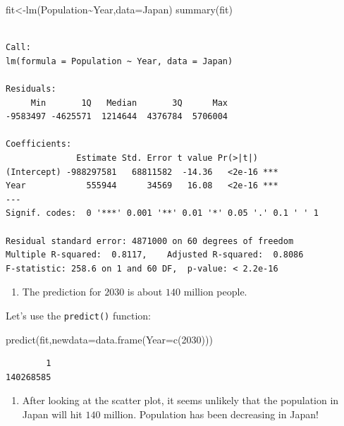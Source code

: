 \documentclass[
  letterpaper,
  DIV=11,
  numbers=noendperiod]{scrreprt}
\newenvironment{Shaded}{\begin{snugshade}}{\end{snugshade}}
\newcommand{\AttributeTok}[1]{\textcolor[rgb]{0.40,0.45,0.13}{#1}}
\newcommand{\DecValTok}[1]{\textcolor[rgb]{0.68,0.00,0.00}{#1}}
\newcommand{\FunctionTok}[1]{\textcolor[rgb]{0.28,0.35,0.67}{#1}}
\newcommand{\NormalTok}[1]{\textcolor[rgb]{0.00,0.23,0.31}{#1}}
\newcommand{\OtherTok}[1]{\textcolor[rgb]{0.00,0.23,0.31}{#1}}
\newcommand{\SpecialCharTok}[1]{\textcolor[rgb]{0.37,0.37,0.37}{#1}}
\providecommand{\tightlist}{%
  \setlength{\itemsep}{0pt}\setlength{\parskip}{0pt}}\usepackage{longtable,booktabs,array}
\begin{document}
\begin{Shaded}
\begin{Highlighting}[numbers=left,,]
\NormalTok{fit}\OtherTok{\textless{}{-}}\FunctionTok{lm}\NormalTok{(Population}\SpecialCharTok{\textasciitilde{}}\NormalTok{Year,}\AttributeTok{data=}\NormalTok{Japan)}
\FunctionTok{summary}\NormalTok{(fit)}
\end{Highlighting}
\end{Shaded}

\begin{verbatim}

Call:
lm(formula = Population ~ Year, data = Japan)

Residuals:
     Min       1Q   Median       3Q      Max 
-9583497 -4625571  1214644  4376784  5706004 

Coefficients:
              Estimate Std. Error t value Pr(>|t|)    
(Intercept) -988297581   68811582  -14.36   <2e-16 ***
Year            555944      34569   16.08   <2e-16 ***
---
Signif. codes:  0 '***' 0.001 '**' 0.01 '*' 0.05 '.' 0.1 ' ' 1

Residual standard error: 4871000 on 60 degrees of freedom
Multiple R-squared:  0.8117,    Adjusted R-squared:  0.8086 
F-statistic: 258.6 on 1 and 60 DF,  p-value: < 2.2e-16
\end{verbatim}

\begin{enumerate}
\def\labelenumi{\arabic{enumi}.}
\setcounter{enumi}{1}
\tightlist
\item
  The prediction for \(2030\) is about \(140\) million people.
\end{enumerate}

Let's use the \texttt{predict()} function:

\begin{Shaded}
\begin{Highlighting}[numbers=left,,]
\FunctionTok{predict}\NormalTok{(fit,}\AttributeTok{newdata=}\FunctionTok{data.frame}\NormalTok{(}\AttributeTok{Year=}\FunctionTok{c}\NormalTok{(}\DecValTok{2030}\NormalTok{)))}
\end{Highlighting}
\end{Shaded}

\begin{verbatim}
        1 
140268585 
\end{verbatim}

\begin{enumerate}
\def\labelenumi{\arabic{enumi}.}
\setcounter{enumi}{2}
\tightlist
\item
  After looking at the scatter plot, it seems unlikely that the
  population in Japan will hit \(140\) million. Population has been
  decreasing in Japan!
\end{enumerate}
\end{document}
